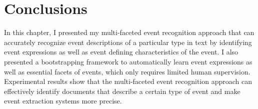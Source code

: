 \section{Conclusions}

In this chapter, I presented my multi-faceted event recognition approach that 
can accurately recognize 
event descriptions of a particular type in text by identifying event
expressions as well as event defining characteristics of the event. 
I also presented a bootstrapping framework to 
automatically learn event expressions as well as essential facets of events, 
which only requires limited human supervision.  
Experimental results show that the multi-faceted event recognition approach 
can effectively identify documents that describe a certain type of event and 
make event extraction systems more precise. 